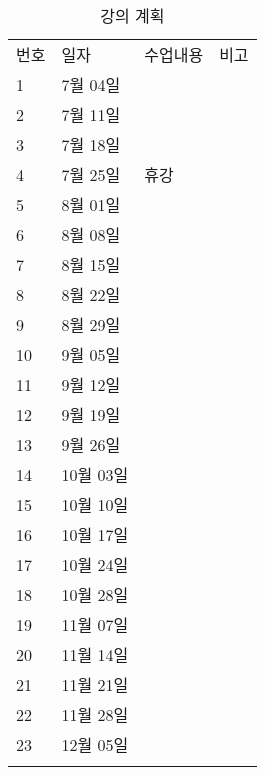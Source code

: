 \documentclass[12pt, a4paper, oneside]{book}
\begin{document}
		\begin{table}[hbp]
		\caption{ 강의 계획 }
		\centering 

		\tabulinesep=3pt

		\begin{tabu} to \linewidth{ X[r,1] X[r,4] X[c,3]   X[c,2] }
			\toprule
			번호		&일자			&수업내용	 	&비고	 \\
			\tabucline[1pt]{-}
			1 		&7월 04일			&	&	 \\ \tabucline[1pt]{=}
			2 		&7월 11일			&	&	 \\ \tabucline[1pt]{=}
			3 		&7월 18일			&	&	 \\ \tabucline[1pt]{=}
			4 		&7월 25일			&휴강	&	 \\ \tabucline[1pt]{=}
			5 		&8월 01일			&	&	 \\ \tabucline[1pt]{=}
			6 		&8월 08일			&	&	 \\ \tabucline[1pt]{=}
			7 		&8월 15일			&	&	 \\ \tabucline[1pt]{=}
			8 		&8월 22일			&	&	 \\ \tabucline[1pt]{=}
			9 		&8월 29일			&	&	 \\ \tabucline[1pt]{=}
			10 		&9월 05일			&	&	 \\ \tabucline[1pt]{=}
			11 		&9월 12일			&	&	 \\ \tabucline[1pt]{=}
			12 		&9월 19일			&	&	 \\ \tabucline[1pt]{=}
			13 		&9월 26일			&	&	 \\ \tabucline[1pt]{=}
			14 		&10월 03일			&	&	 \\ \tabucline[1pt]{=}
			15 		&10월 10일			&	&	 \\ \tabucline[1pt]{=}
			16 		&10월 17일			&	&	 \\ \tabucline[1pt]{=}
			17 		&10월 24일			&	&	 \\ \tabucline[1pt]{=}
			18 		&10월 28일			&	&	 \\ \tabucline[1pt]{=}
			19 		&11월 07일			&	&	 \\ \tabucline[1pt]{=}
			20 		&11월 14일			&	&	 \\ \tabucline[1pt]{=}
			21 		&11월 21일			&	&	 \\ \tabucline[1pt]{=}
			22 		&11월 28일			&	&	 \\ \tabucline[1pt]{=}
			23 		&12월 05일			&	&	 \\ \tabucline[1pt]{=}

			\bottomrule
		\end{tabu}

		\end{table}
\end{document}

